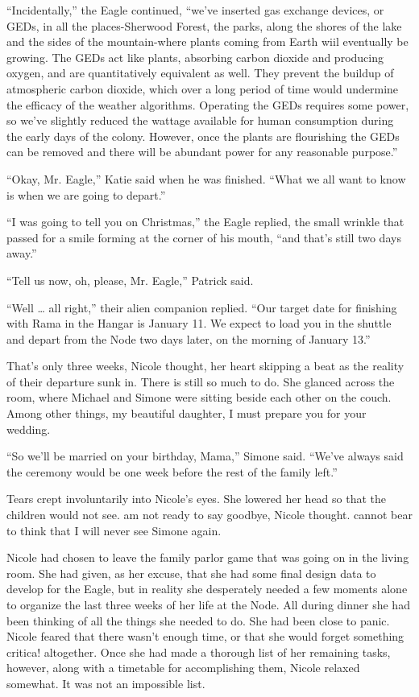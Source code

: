 \documentclass[]{article}
\begin{document}
{“Incidentally,” the Eagle continued, “we’ve inserted gas exchange devices, or GEDs, in all the places-Sherwood Forest, the parks, along the shores of the lake and the sides of the mountain-where plants coming from Earth wiil eventually be growing.  The GEDs act like plants, absorbing carbon dioxide and producing oxygen, and are quantitatively equivalent as well.  They prevent the buildup of atmospheric carbon dioxide, which over a long period of time would undermine the efficacy of the weather algorithms.  Operating the GEDs requires some power, so we’ve slightly reduced the wattage available for human consumption during the early days of the colony.  However, once the plants are flourishing the GEDs can be removed and there will be abundant power for any reasonable purpose.”

“Okay, Mr.  Eagle,” Katie said when he was finished.  “What we all want to know is when we are going to depart.”

“I was going to tell you on Christmas,” the Eagle replied, the small wrinkle that passed for a smile forming at the corner of his mouth, “and that’s still two days away.”

“Tell us now, oh, please, Mr.  Eagle,” Patrick said.

“Well … all right,” their alien companion replied.  “Our target date for finishing with Rama in the Hangar is January 11.  We expect to load you in the shuttle and depart from the Node two days later, on the morning of January 13.”

That’s only three weeks, Nicole thought, her heart skipping a beat as the reality of their departure sunk in.  There is still so much to do.  She glanced across the room, where Michael and Simone were sitting beside each other on the couch.  Among other things, my beautiful daughter, I must prepare you for your wedding.

“So we’ll be married on your birthday, Mama,” Simone said.  “We’ve always said the ceremony would be one week before the rest of the family left.”

Tears crept involuntarily into Nicole’s eyes.  She lowered her head so that the children would not see.  am not ready to say goodbye, Nicole thought.  cannot bear to think that I will never see Simone again.

Nicole had chosen to leave the family parlor game that was going on in the living room.  She had given, as her excuse, that she had some final design data to develop for the Eagle, but in reality she desperately needed a few moments alone to organize the last three weeks of her life at the Node.  All during dinner she had been thinking of all the things she needed to do.  She had been close to panic.  Nicole feared that there wasn’t enough time, or that she would forget something critica! altogether.  Once she had made a thorough list of her remaining tasks, however, along with a timetable for accomplishing them, Nicole relaxed somewhat.  It was not an impossible list.

}
\end{document}
